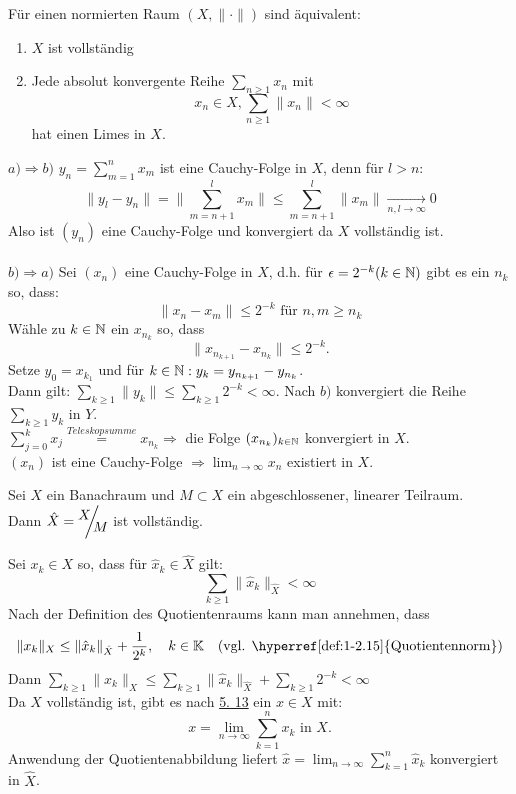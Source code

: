 \begin{lemma} \label{lemma:5.13}
	Für einen normierten Raum $(X, \| \cdot \|)$ sind äquivalent:
	\begin{enumerate}[label=\alph*\upshape)]
		\item $X$ ist vollständig
		\item Jede absolut konvergente Reihe $\sum_{n \geq 1} x_{n}$ mit
			\[ x_{n} \in X, \sum_{n \geq 1} \| x_{n} \| < \infty \]
			hat einen Limes in $X$.
	\end{enumerate}	
\end{lemma}
\begin{beweis}
	$a) \Rightarrow b)$	$y_{n} = \sum_{m = 1}^{n} x_{m}$ ist eine Cauchy-Folge in $X$, denn für $l > n$:
		\[ \| y_{l} - y_{n} \| = \| \sum_{m = n + 1}^{l} x_{m} \| \leq \sum_{m = n + 1}^{l} \| x_{m} \| \xrightarrow[n, l \rightarrow \infty]{} 0 \]
	Also ist $(y_{n})$ eine Cauchy-Folge und konvergiert da $X$ vollständig ist. \\ \\
	$b) \Rightarrow a)$	Sei $(x_{n})$ eine Cauchy-Folge in $X$, d.h. für $\epsilon = 2^{-k} (k \in \mathbb{N})$ gibt es ein $n_{k}$ so, dass:
		\[ \| x_{n} - x_{m} \| \leq 2^{-k} \text{ für } n, m \geq n_{k} \]
		Wähle zu $k \in \mathbb{N}$ ein $x_{n_{k}}$ so, dass
		\[ \| x_{n_{k+1}} - x_{n_{k}} \| \leq 2^{-k}.\]
		Setze $y_{0} = x_{k_{1}}$ und für $k \in \mathbb{N}: y_{k} = y_{n_{k+1}} - y_{n_{k}}$. \\
		Dann gilt: $\sum_{k \geq 1} \| y_{k} \| \leq \sum_{k \geq 1} 2^{-k} < \infty$. Nach $b)$ konvergiert die Reihe $\sum_{k \geq 1} y_{k}$ in $Y$. \\
		$\sum_{j = 0}^{k} x_{j} \overset{Teleskopsumme}{=} x_{n_{k}} \Rightarrow $ die Folge $(x_{n_{k}})_{k \in \mathbb{N}}$ konvergiert in $X$. \\
		$(x_{n})$ ist eine Cauchy-Folge $\Rightarrow \lim_{n \rightarrow \infty} x_{n}$ existiert in $X$.
\end{beweis}

\begin{kor}
	Sei $X$ ein Banachraum und $M \subset X$ ein abgeschlossener, linearer Teilraum. \\
	Dann $\hat X = \QR{X}{M}$ ist vollständig.
	\begin{beweis}	
		Sei $x_{k} \in X$ so, dass für $\hat x_{k} \in \hat X$ gilt:
		\[ \sum_{k \geq 1} \| \hat x_{k} \|_{\hat X} < \infty \]
		Nach der Definition des Quotientenraums kann man annehmen, dass
		\[ \| x_{k} \|_{X} \leq \| \hat x_{k} \|_{\hat X} + \frac{1}{2^{k}}, \quad k \in \MdK \quad \text{(vgl. \hyperref[def:1-2.15]{Quotientennorm})} \]
		Dann $\sum_{k \geq 1} \| x_{k} \|_{X} \leq \sum_{k \geq 1} \| \hat x_{k} \|_{\hat X} + \sum_{k \geq 1} 2^{-k} < \infty$ \\
		Da $X$ vollständig ist, gibt es nach \hyperref[lemma:1-5.13]{5. 13} ein $x \in X$ mit:
			\[ x = \lim_{n \rightarrow \infty} \sum_{k = 1}^{n} x_{k} \text{ in } X. \]
		Anwendung der Quotientenabbildung liefert $\hat x = \lim_{n \rightarrow \infty} \sum_{k = 1}^{n} \hat x_{k}$ konvergiert in $\hat X$.
	\end{beweis}
\end{kor}

